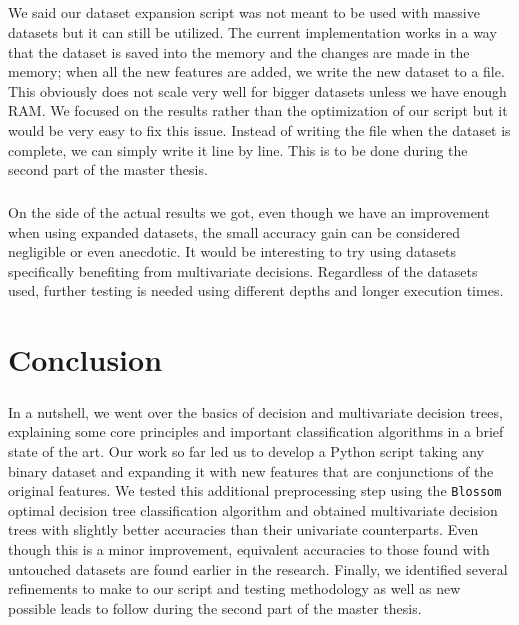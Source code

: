 \documentclass[12pt]{report}
\theoremstyle{definition}
\theoremstyle{definition}
\theoremstyle{definition}
\begin{document}
\paragraph{} We said our dataset expansion script was not meant to be used with massive datasets but it can still
be utilized. The current implementation works in a way that the dataset is saved into the memory and the changes are
made in the memory; when all the new features are added, we write the new dataset to a file. This obviously does not
scale very well for bigger datasets unless we have enough RAM. We focused on the results rather than the optimization
of our script but it would be very easy to fix this issue. Instead of writing the file when the dataset is complete,
we can simply write it line by line. This is to be done during the second part of the master thesis.

\paragraph{} On the side of the actual results we got, even though we have an improvement when using expanded datasets,
the small accuracy gain can be considered negligible or even anecdotic. It would be interesting to try using datasets
specifically benefiting from multivariate decisions. Regardless of the datasets used, further testing is needed using
different depths and longer execution times.



\chapter*{Conclusion}
\paragraph{} In a nutshell, we went over the basics of decision and multivariate decision trees, explaining some core
principles and important classification algorithms in a brief state of the art. Our work so far led us to develop
a Python script taking any binary dataset and expanding it with new features that are conjunctions of the original
features. We tested this additional preprocessing step using the \texttt{Blossom} optimal decision tree classification
algorithm and obtained multivariate decision trees with slightly better accuracies than their univariate counterparts.
Even though this is a minor improvement, equivalent accuracies to those found with untouched datasets are found earlier
in the research. Finally, we identified several refinements to make to our script and testing methodology as well as
new possible leads to follow during the second part of the master thesis.
\end{document}
